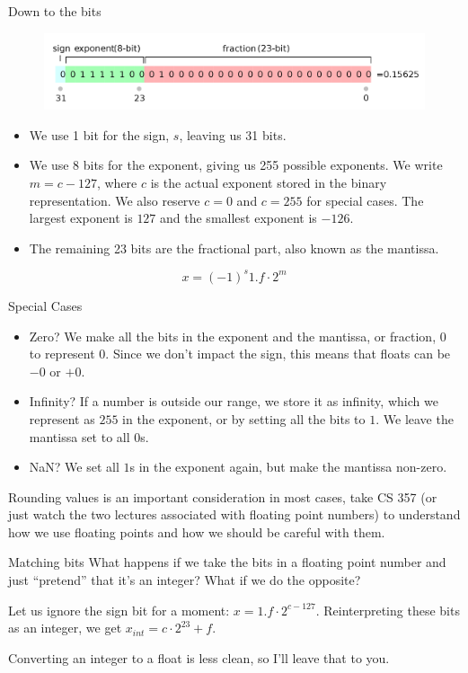 \documentclass[aspectratio=169]{beamer}
\begin{document}
\begin{frame}{Down to the bits}
    \begin{figure}
        \centering
        \includegraphics[width=\textwidth]{ieee_single.png}
    \end{figure}
    \begin{itemize}
        \item We use 1 bit for the sign, $s$, leaving us 31 bits. 
        \item We use 8 bits for the exponent, giving us 255 possible exponents. We write $m = c - 127$, where $c$ is the actual exponent stored in the binary representation. We also reserve $c = 0$ and $c = 255$ for special cases. The largest exponent is $127$ and the smallest exponent is $-126$. 
        \item The remaining 23 bits are the fractional part, also known as the mantissa. 
    \end{itemize}
    $$x = (-1)^s 1.f \cdot 2^m$$
\end{frame}

\begin{frame}{Special Cases}
    \begin{itemize}
        \item Zero? \pause We make all the bits in the exponent and the mantissa, or fraction, $0$ to represent 0. Since we don't impact the sign, this means that floats can be $-0$ or $+0$. \pause 
        \item Infinity? \pause If a number is outside our range, we store it as infinity, which we represent as $255$ in the exponent, or by setting all the bits to $1$. We leave the mantissa set to all $0$s. \pause 
        \item NaN? \pause We set all $1$s in the exponent again, but make the mantissa non-zero.
    \end{itemize}

    Rounding values is an important consideration in most cases, take CS 357 (or just watch the two lectures associated with floating point numbers) to understand how we use floating points and how we should be careful with them. 
\end{frame}

\begin{frame}{Matching bits}
    What happens if we take the bits in a floating point number and just ``pretend'' that it's an integer? What if we do the opposite? \pause 
    
    Let us ignore the sign bit for a moment: $x = 1.f \cdot 2^{c - 127}$. Reinterpreting these bits as an integer, we get $x_{int} = c \cdot 2^{23} + f$.  \pause

    Converting an integer to a float is less clean, so I'll leave that to you. 

\end{frame}
\end{document}

